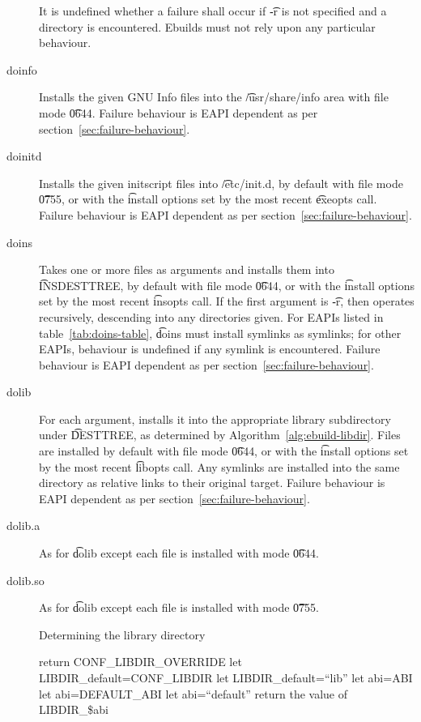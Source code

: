 \begin{description}
    It is undefined whether a failure shall occur if \t{-r} is not specified and a directory is
    encountered. Ebuilds must not rely upon any particular behaviour.

\item[doinfo] Installs the given GNU Info files into the \t{/usr/share/info} area with file mode
    \t{0644}. Failure behaviour is EAPI dependent as per section~\ref{sec:failure-behaviour}.

\item[doinitd] Installs the given initscript files into \t{/etc/init.d}, by default with file mode
    \t{0755}, or with the \t{install} options set by the most recent \t{exeopts} call.
    Failure behaviour is EAPI dependent as per section~\ref{sec:failure-behaviour}.

\item[doins]  Takes one or more files as arguments and installs them into
    \t{INSDESTTREE}, by default with file mode \t{0644}, or with the \t{install} options set by
    the most recent \t{insopts} call. If the first argument is \t{-r}, then operates recursively,
    descending into any directories given. For EAPIs listed in table~\ref{tab:doins-table},
    \t{doins} must install symlinks as symlinks; for other EAPIs, behaviour is undefined if any
    symlink is encountered. Failure behaviour is EAPI dependent as per
    section~\ref{sec:failure-behaviour}.

\item[dolib] For each argument, installs it into the appropriate library subdirectory under
    \t{DESTTREE}, as determined by Algorithm~\ref{alg:ebuild-libdir}. Files are installed by default
    with file mode \t{0644}, or with the \t{install} options set by the most recent \t{libopts}
    call. Any symlinks are installed into the same directory as relative links to their original
    target. Failure behaviour is EAPI dependent as per section~\ref{sec:failure-behaviour}.

\item[dolib.a] As for \t{dolib} except each file is installed with mode \t{0644}.

\item[dolib.so] As for \t{dolib} except each file is installed with mode \t{0755}.

\begin{algorithm}
\caption{Determining the library directory} \label{alg:ebuild-libdir}
\begin{algorithmic}[1]
    \STATE return CONF_LIBDIR_OVERRIDE
\ENDIF
{}
    \STATE let LIBDIR_default=CONF_LIBDIR
\ELSE
    \STATE let LIBDIR_default=``lib''
\ENDIF
{}
    \STATE let abi=ABI
    \STATE let abi=DEFAULT_ABI
\ELSE
    \STATE let abi=``default''
\ENDIF
\STATE return the value of LIBDIR_\$abi
\end{algorithmic}
\end{algorithm}


\end{description}
